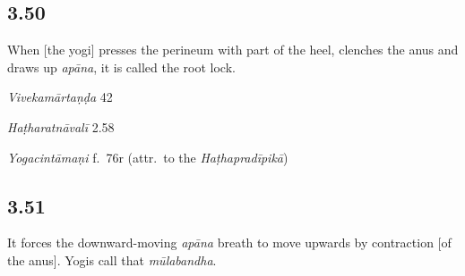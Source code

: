 \begin{ekdosis}

\subsection*{3.50}
\begin{translation}[hp03_050]
When [the yogi] presses the perineum with part of the heel, clenches the anus and draws up \emph{apāna}, it is called the root lock.
\end{translation}

\begin{sources}[hp03_050]
\emph{Vivekamārtaṇḍa} 42
\begin{versinnote}
\end{versinnote}
\end{sources}

\begin{testimonia}[hp03_050]
\emph{Haṭharatnāvalī} 2.58
\begin{versinnote}
\end{versinnote}

\emph{Yogacintāmaṇi} f.~76r (attr.~to the \emph{Haṭhapradīpikā})
\begin{versinnote}
\end{versinnote}

\end{testimonia}


\subsection*{3.51}
\begin{translation}[hp03_051]
It forces the downward-moving \emph{apāna} breath to move upwards by contraction [of the anus]. Yogis call that \emph{mūlabandha}.
\end{translation}


\end{ekdosis}
